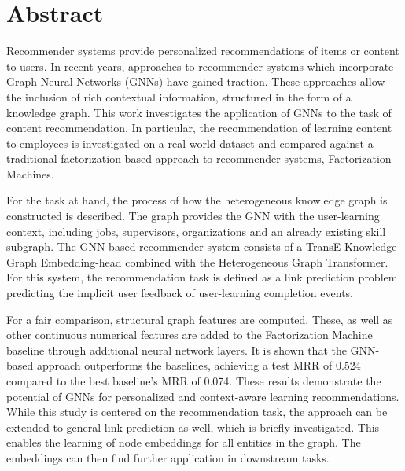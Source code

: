 \chapter*{Abstract}
\noindent 
Recommender systems provide personalized recommendations of items or content to users. In recent years, approaches to recommender systems which incorporate Graph Neural Networks (GNNs) have gained traction. These approaches allow the inclusion of rich contextual information, structured in the form of a knowledge graph. This work investigates the application of GNNs to the task of content recommendation. In particular, the recommendation of learning content to employees is investigated on a real world dataset and compared against a traditional factorization based approach to recommender systems, Factorization Machines.

For the task at hand, the process of how the heterogeneous knowledge graph is constructed is described. The graph provides the GNN with the user-learning context, including jobs, supervisors, organizations and an already existing skill subgraph. The GNN-based recommender system consists of a TransE Knowledge Graph Embedding-head combined with the Heterogeneous Graph Transformer. For this system, the recommendation task is defined as a link prediction problem predicting the implicit user feedback of user-learning completion events. 

For a  fair comparison, structural graph features are computed. These, as well as other continuous numerical features are added to the Factorization Machine baseline through additional neural network layers. It is shown that the GNN-based approach outperforms the baselines, achieving a test MRR of 0.524 compared to the best baseline's MRR of 0.074. These results demonstrate the potential of GNNs for personalized and context-aware learning recommendations. While this study is centered on the recommendation task, the approach can be extended to general link prediction as well, which is briefly investigated. This enables the learning of node embeddings for all entities in the graph. The embeddings can then find further application in downstream tasks.






